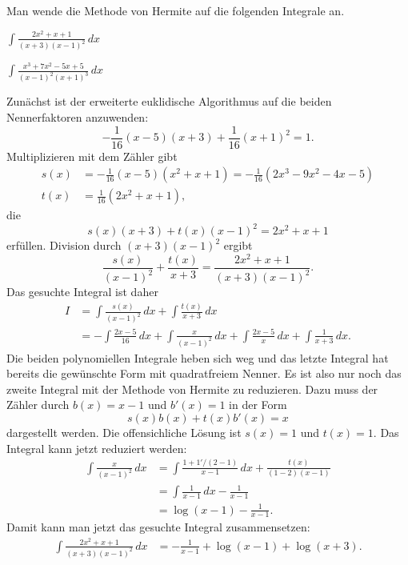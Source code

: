 Man wende die Methode von Hermite auf die folgenden Integrale an.
\begin{teilaufgaben}
\item $\displaystyle
\int \frac{2x^2+x+1}{(x+3)(x-1)^2}\,dx$
\item $\displaystyle
\int \frac{x^3+7x^2-5x+5}{(x-1)^2(x+1)^3}\,dx$
\end{teilaufgaben}

\begin{loesung}
\begin{teilaufgaben}
\item 
Zunächst ist der erweiterte euklidische Algorithmus auf die beiden
Nennerfaktoren anzuwenden:
\[
-\frac{1}{16}(x-5)(x+3)+\frac{1}{16}(x+1)^2 = 1.
\]
Multiplizieren mit dem Zähler gibt
\[
\begin{aligned}
s(x)
&=
-\frac{1}{16}(x-5)(x^2+x+1)
=
-\frac{1}{16}(
2 x^3 - 9 x^2  - 4 x - 5
)
\\
t(x)
&=
\frac{1}{16}(2x^2+x+1),
\end{aligned}
\]
die 
\[
s(x) (x+3) + t(x) (x-1)^2 = 2x^2 + x + 1
\]
erfüllen.
Division durch $(x+3)(x-1)^2$ ergibt
\[
\frac{s(x)}{(x-1)^2}
+
\frac{t(x)}{x+3}
=
\frac{2x^2+x+1}{(x+3)(x-1)^2}.
\]
Das gesuchte Integral ist daher
\begin{align*}
I
&=
\int \frac{s(x)}{(x-1)^2}\,dx
+
\int \frac{t(x)}{x+3}\,dx
\\
&=
-\int \frac{2x-5}{16}\,dx +\int \frac{x}{(x-1)^2}\,dx
+
\int \frac{2x-5}{x}\,dx + \int \frac{1}{x+3}\,dx.
\end{align*}
Die beiden polynomiellen Integrale heben sich weg und das letzte
Integral hat bereits die gewünschte Form mit quadratfreiem Nenner.
Es ist also nur noch das zweite Integral mit der Methode von Hermite
zu reduzieren.
Dazu muss der Zähler durch $b(x)=x-1$ und $b'(x)=1$ in der Form
\[
s(x) b(x) + t(x) b'(x) = x
\]
dargestellt werden.
Die offensichliche Lösung ist $s(x)=1$ und $t(x)=1$.
Das Integral kann jetzt reduziert werden:
\begin{align*}
\int \frac{x}{(x-1)^2}\,dx
&=
\int\frac{1+1'/(2-1)}{x-1}\,dx
+
\frac{t(x)}{(1-2)(x-1)}
\\
&=
\int\frac{1}{x-1}\,dx
-
\frac{1}{x-1}
\\
&=
\log(x-1) - \frac{1}{x-1}.
\end{align*}
Damit kann man jetzt das gesuchte Integral zusammensetzen:
\begin{align*}
\int \frac{2x^2+x+1}{(x+3)(x-1)^2}\,dx
&=
-\frac{1}{x-1}+\log(x-1)
+\log(x+3).
\end{align*}


\end{teilaufgaben}
\end{loesung}
